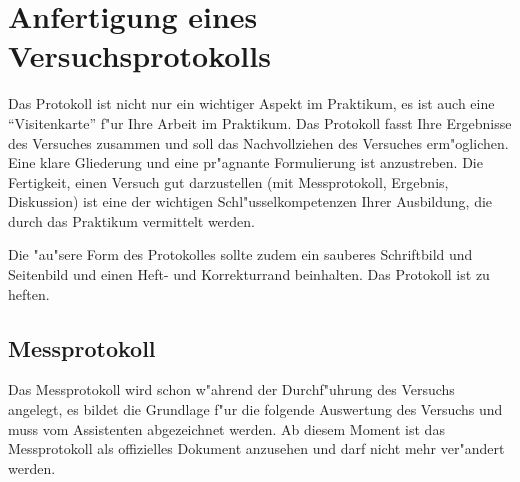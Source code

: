 \chapter{Anfertigung eines Versuchsprotokolls}
\label{c:protokoll}

Das Protokoll ist nicht nur ein wichtiger Aspekt im Praktikum,
es ist auch eine "`Visitenkarte"' f"ur Ihre Arbeit im Praktikum. Das
Protokoll fasst Ihre Ergebnisse des Versuches zusammen und soll das
Nachvollziehen des Versuches erm"oglichen. Eine klare Gliederung und
eine pr"agnante Formulierung ist anzustreben. Die Fertigkeit, einen Versuch
gut darzustellen (mit Messprotokoll, Ergebnis, Diskussion) ist eine der wichtigen
Schl"usselkompetenzen Ihrer Ausbildung, die durch das Praktikum vermittelt werden.

Die "au"sere Form des Protokolles sollte zudem ein sauberes
Schriftbild und Seitenbild und einen Heft- und Korrekturrand
beinhalten. Das Protokoll ist zu heften.

%
%
%
%
%
%




\section{Messprotokoll}

Das Messprotokoll wird schon w"ahrend der Durchf"uhrung des Versuchs angelegt, es bildet die Grundlage f"ur die folgende Auswertung des Versuchs und muss vom Assistenten abgezeichnet werden. Ab diesem Moment ist das Messprotokoll als offizielles Dokument anzusehen und darf nicht mehr ver"andert werden.

